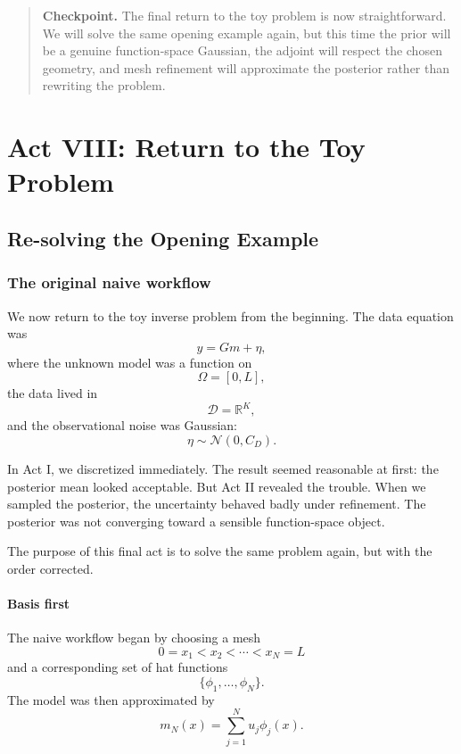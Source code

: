 \documentclass[11pt,a4paper]{book}
\newenvironment{checkpoint}
  {\begin{quote}\textbf{Checkpoint.}}
  {\end{quote}}
\newcommand{\D}{\mathcal{D}}      %
\newcommand{\R}{\mathbb{R}}
\newcommand{\noise}{\eta}
\newcommand{\obs}{y}
\newcommand{\G}{G}
\begin{document}
\begin{checkpoint}
The final return to the toy problem is now straightforward. We will solve the
same opening example again, but this time the prior will be a genuine
function-space Gaussian, the adjoint will respect the chosen geometry, and mesh
refinement will approximate the posterior rather than rewriting the problem.
\end{checkpoint}

\part{Act VIII: Return to the Toy Problem}

\chapter{Re-solving the Opening Example}

\section{The original naive workflow}

We now return to the toy inverse problem from the beginning. The data equation
was
\[
    \obs = \G m + \noise,
\]
where the unknown model was a function on
\[
    \Omega=[0,L],
\]
the data lived in
\[
    \D=\R^K,
\]
and the observational noise was Gaussian:
\[
    \noise\sim\mathcal{N}(0,C_D).
\]

In Act I, we discretized immediately. The result seemed reasonable at first:
the posterior mean looked acceptable. But Act II revealed the trouble. When we
sampled the posterior, the uncertainty behaved badly under refinement. The
posterior was not converging toward a sensible function-space object.

The purpose of this final act is to solve the same problem again, but with the
order corrected.

\subsection{Basis first}

The naive workflow began by choosing a mesh
\[
    0=x_1<x_2<\cdots<x_N=L
\]
and a corresponding set of hat functions
\[
    \{\phi_1,\ldots,\phi_N\}.
\]
The model was then approximated by
\[
    m_N(x)
    =
    \sum_{j=1}^N u_j\phi_j(x).
\]
\end{document}

